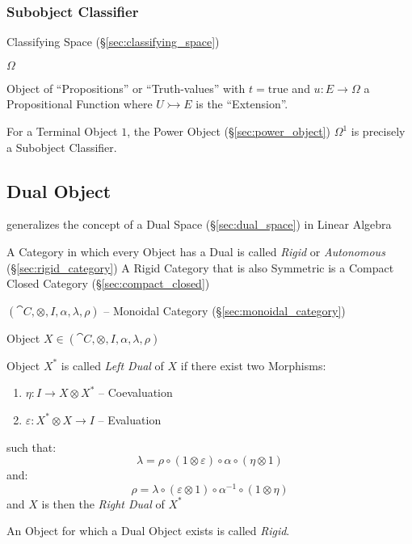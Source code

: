 \subsubsection{Subobject Classifier}\label{sec:subobject_classifier}

Classifying Space (\S\ref{sec:classifying_space})

$\Omega$

Object of ``Propositions'' or ``Truth-values'' with $t =
\mathrm{true}$ and $u : E \rightarrow \Omega$ a Propositional Function
where $U \rightarrowtail E$ is the ``Extension''.

For a Terminal Object $1$, the Power Object (\S\ref{sec:power_object})
$\Omega^1$ is precisely a Subobject Classifier.



\subsection{Dual Object}\label{sec:dual_object}

generalizes the concept of a Dual Space (\S\ref{sec:dual_space}) in
Linear Algebra

A Category in which every Object has a Dual is called \emph{Rigid} or
\emph{Autonomous} (\S\ref{sec:rigid_category}) A Rigid Category that
is also Symmetric is a Compact Closed Category
(\S\ref{sec:compact_closed})

$(\cat{C}, \otimes, I, \alpha, \lambda, \rho)$ -- Monoidal Category
(\S\ref{sec:monoidal_category})

Object $X \in (\cat{C}, \otimes, I, \alpha, \lambda, \rho)$

Object $X^*$ is called \emph{Left Dual} of $X$ if there exist two
Morphisms:
\begin{enumerate}
  \item $\eta : I \rightarrow X \otimes X^*$ -- Coevaluation
  \item $\varepsilon : X^* \otimes X \rightarrow I$ -- Evaluation
\end{enumerate}
such that:
\[
  \lambda = \rho \circ (1 \otimes \varepsilon) \circ \alpha \circ
    (\eta \otimes 1)
\]
and:
\[
  \rho = \lambda \circ (\varepsilon \otimes 1) \circ \alpha^{-1}
    \circ (1 \otimes \eta)
\]
and $X$ is then the \emph{Right Dual} of $X^*$

An Object for which a Dual Object exists is called \emph{Rigid}.

